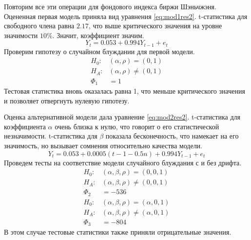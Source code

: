 \documentclass[a4paper,12pt]{article}
\begin{document}
Повторим все эти операции для фондового индекса биржи Шэньчжэня. Оцененная первая модель приняла вид уравнения \ref{eq:mod1res2}. t-статистика для свободного члена равна $2.17$, что выше критического значения на уровне значимости $10\%$. Значит, коэффициент значим.
\begin{equation}
  \label{eq:mod1res2}
  Y_t=0.053+0.994Y_{t-1}+e_t
\end{equation}
Проверим гипотезу о случайном блуждании для первой модели.
\begin{align}
  H_0:&(\alpha,\rho)=(0,1)\\
  H_A:&(\alpha,\rho)\neq(0,1)\\
  \Phi_1&=1
\end{align}
Тестовая статистика вновь оказалась равна 1, что меньше критического значения и позволяет отвергнуть нулевую гипотезу.

Оценка альтернативной модели дала уравнение \ref{eq:mod2res2}. t-статистика для коэффициента $\alpha$ очень близка к нулю, что говорит о его статистической незначимости. t-статистика для $\beta$ показала бесконечность, что намекает на его значимость, но вызывает сомнения относительно качества модели.
\begin{equation}
  \label{eq:mod2res2}
  Y_t=0.053+0.0005(t-1-0.5n)+0.994Y_{t-1}+e_t
\end{equation}
Проведем тесты на соответствие модели случайного блуждания с и без дрифта.
\begin{align}
  H_0:&(\alpha, \beta, \rho)=(0,0,1)\\
  H_A:&(\alpha,\beta, \rho)\neq(0,0,1)\\
  \Phi_2&=-536\\
  H_0:&(\alpha, \beta, \rho)=(\alpha,0,1)\\
  H_A:&(\alpha,\beta, \rho)\neq(\alpha,0,1)\\
  \Phi_3&=-804
\end{align}
В этом случае тестовые статистики также приняли отрицательные значения.
\newpage


\end{document}
